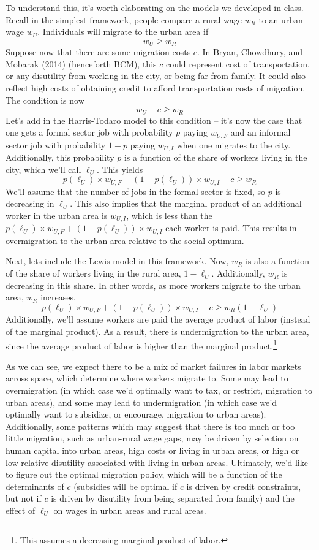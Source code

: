 \documentclass[12pt,english]{article}
\begin{document}
To understand this, it's worth elaborating on the models we developed in class. Recall in the simplest framework, people compare a rural wage $w_{R}$ to an urban wage $w_{U}$. Individuals will migrate to the urban area if
$$ w_{U} \geq w_{R} $$
Suppose now that there are some migration costs $c$. In Bryan, Chowdhury, and Mobarak (2014) (henceforth BCM), this $c$ could represent cost of transportation, or any disutility from working in the city, or being far from family. It could also reflect high costs of obtaining credit to afford transportation costs of migration. The condition is now
$$ w_{U} - c \geq w_{R} $$
Let's add in the Harris-Todaro model to this condition -- it's now the case that one gets a formal sector job with probability $p$ paying $w_{U,F}$ and an informal sector job with probability $1 - p$ paying $w_{U,I}$ when one migrates to the city. Additionally, this probability $p$ is a function of the share of workers living in the city, which we'll call $\ell_{U}$. This yields
$$ p(\ell_{U}) \times w_{U,F} + (1 - p(\ell_{U})) \times w_{U,I} - c \geq w_{R} $$
We'll assume that the number of jobs in the formal sector is fixed, so $p$ is decreasing in $\ell_{U}$. This also implies that the marginal product of an additional worker in the urban area is $w_{U,I}$, which is less than the $ p(\ell_{U}) \times w_{U,F} + (1 - p(\ell_{U})) \times w_{U,I}$ each worker is paid. This results in overmigration to the urban area relative to the social optimum.

Next, lets include the Lewis model in this framework. Now, $w_{R}$ is also a function of the share of workers living in the rural area, $1 - \ell_{U}$. Additionally, $w_{R}$ is decreasing in this share. In other words, as more workers migrate to the urban area, $w_{R}$ increases.
$$ p(\ell_{U}) \times w_{U,F} + (1 - p(\ell_{U})) \times w_{U,I} - c \geq w_{R}(1 - \ell_{U}) $$
Additionally, we'll assume workers are paid the average product of labor (instead of the marginal product). As a result, there is undermigration to the urban area, since the average product of labor is higher than the marginal product.\footnote{This assumes a decreasing marginal product of labor.}

As we can see, we expect there to be a mix of market failures in labor markets across space, which determine where workers migrate to. Some may lead to overmigration (in which case we'd optimally want to tax, or restrict, migration to urban areas), and some may lead to undermigration (in which case we'd optimally want to subsidize, or encourage, migration to urban areas). Additionally, some patterns which may suggest that there is too much or too little migration, such as urban-rural wage gaps, may be driven by selection on human capital into urban areas, high costs or living in urban areas, or high or low relative disutility associated with living in urban areas. Ultimately, we'd like to figure out the optimal migration policy, which will be a function of the determinants of $c$ (subsidies will be optimal if $c$ is driven by credit constraints, but not if $c$ is driven by disutility from being separated from family) and the effect of $\ell_{U}$ on wages in urban areas and rural areas.
\end{document}
